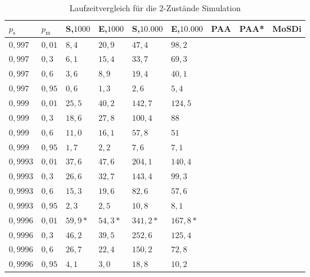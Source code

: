 \begin{table}[h]
\centering
\caption{Laufzeitvergleich für die 2-Zustände Simulation}
\label{2s_laufzeit}
\begin{tabular}{|l|l||l|l|l|l|l|l|l|} \hline
$p_\text{s}$     & $p_\text{m}$   & S,$1000$ & E,$1000$ & S,$10.000$ & E,$10.000$ & PAA & PAA* & MoSDi \\ \hline \hline
$0,997  $ & $ 0,01 $ & $ 8,4  $ & $ 20,9  $ & $ 47,4  $ & $98,2  $ & $  $ & $ $ & $  $\\ \hline
$0,997  $ & $ 0,3  $ & $ 6,1  $ & $ 15,4  $ & $ 33,7  $ & $69,3  $ & $  $ & $ $ & $  $\\ \hline
$0,997  $ & $ 0,6  $ & $ 3,6  $ & $ 8,9   $  & $ 19,4 $ & $40,1  $ & $  $ & $ $ & $  $\\ \hline
$0,997  $ & $ 0,95 $ & $ 0,6  $ & $ 1,3   $  & $ 2,6  $ & $5,4   $ & $  $ & $ $ & $  $\\ \hline
$0,999  $ & $ 0,01 $ & $ 25,5 $ & $ 40,2  $ & $ 142,7 $ & $124,5 $ & $  $ & $ $ & $  $\\ \hline
$0,999  $ & $ 0,3  $ & $ 18,6 $ & $ 27,8  $ & $ 100,4 $ & $88    $ & $  $ & $ $ & $  $\\ \hline
$0,999  $ & $ 0,6  $ & $ 11,0 $ & $ 16,1  $ & $ 57,8  $ & $51    $ & $  $ & $ $ & $  $\\ \hline
$0,999  $ & $ 0,95 $ & $ 1,7  $ & $ 2,2   $ & $ 7,6   $ & $7,1   $ & $  $ & $ $ & $  $\\ \hline
$0,9993 $ & $ 0,01 $ & $ 37,6 $ & $ 47,6  $ & $ 204,1 $ & $140,4 $ & $  $ & $ $ & $  $\\ \hline
$0,9993 $ & $ 0,3  $ & $ 26,6 $ & $ 32,7  $ & $ 143,4 $ & $99,3  $ & $  $ & $ $ & $  $\\ \hline
$0,9993 $ & $ 0,6  $ & $ 15,3 $ & $ 19,6  $ & $ 82,6  $ & $57,6  $ & $  $ & $ $ & $  $\\ \hline
$0,9993 $ & $ 0,95 $ & $ 2,3  $ & $ 2,5   $ & $ 10,8  $ & $8,1   $ & $  $ & $ $ & $  $\\ \hline
$0,9996 $ & $ 0,01 $ & $ 59,9*$ & $ 54,3* $ & $341,2* $ & $167,8*$ & $  $ & $ $ & $  $\\ \hline
$0,9996 $ & $ 0,3  $ & $ 46,2 $ & $ 39,5  $ & $ 252,6 $ & $125,4 $ & $  $ & $ $ & $  $\\ \hline
$0,9996 $ & $ 0,6  $ & $ 26,7 $ & $ 22,4  $ & $ 150,2 $ & $72,8  $ & $  $ & $ $ & $  $\\ \hline
$0,9996 $ & $ 0,95 $ & $ 4,1  $ & $ 3,0   $ & $ 18,8  $ & $10,2  $ & $  $ & $ $ & $  $\\ \hline
\end{tabular}
\end{table}

